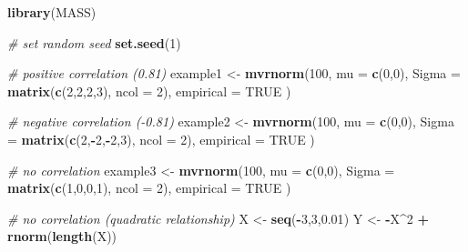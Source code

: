 \documentclass[]{book}
\newenvironment{Shaded}{\begin{snugshade}}{\end{snugshade}}
\newcommand{\KeywordTok}[1]{\textcolor[rgb]{0.13,0.29,0.53}{\textbf{#1}}}
\newcommand{\DataTypeTok}[1]{\textcolor[rgb]{0.13,0.29,0.53}{#1}}
\newcommand{\DecValTok}[1]{\textcolor[rgb]{0.00,0.00,0.81}{#1}}
\newcommand{\FloatTok}[1]{\textcolor[rgb]{0.00,0.00,0.81}{#1}}
\newcommand{\StringTok}[1]{\textcolor[rgb]{0.31,0.60,0.02}{#1}}
\newcommand{\CommentTok}[1]{\textcolor[rgb]{0.56,0.35,0.01}{\textit{#1}}}
\newcommand{\OtherTok}[1]{\textcolor[rgb]{0.56,0.35,0.01}{#1}}
\newcommand{\OperatorTok}[1]{\textcolor[rgb]{0.81,0.36,0.00}{\textbf{#1}}}
\newcommand{\NormalTok}[1]{#1}
\theoremstyle{definition}
\theoremstyle{definition}
\theoremstyle{definition}
\theoremstyle{remark}
\begin{document}
\begin{Shaded}
\begin{Highlighting}[]
\KeywordTok{library}\NormalTok{(MASS)}

\CommentTok{# set random seed}
\KeywordTok{set.seed}\NormalTok{(}\DecValTok{1}\NormalTok{)}

\CommentTok{# positive correlation (0.81)}
\NormalTok{example1 <-}\StringTok{ }\KeywordTok{mvrnorm}\NormalTok{(}\DecValTok{100}\NormalTok{,}
                    \DataTypeTok{mu =} \KeywordTok{c}\NormalTok{(}\DecValTok{0}\NormalTok{,}\DecValTok{0}\NormalTok{), }
                    \DataTypeTok{Sigma =} \KeywordTok{matrix}\NormalTok{(}\KeywordTok{c}\NormalTok{(}\DecValTok{2}\NormalTok{,}\DecValTok{2}\NormalTok{,}\DecValTok{2}\NormalTok{,}\DecValTok{3}\NormalTok{), }\DataTypeTok{ncol =} \DecValTok{2}\NormalTok{),}
                    \DataTypeTok{empirical =} \OtherTok{TRUE}
\NormalTok{                    )}

\CommentTok{# negative correlation (-0.81)}
\NormalTok{example2 <-}\StringTok{ }\KeywordTok{mvrnorm}\NormalTok{(}\DecValTok{100}\NormalTok{,}
                    \DataTypeTok{mu =} \KeywordTok{c}\NormalTok{(}\DecValTok{0}\NormalTok{,}\DecValTok{0}\NormalTok{), }
                    \DataTypeTok{Sigma =} \KeywordTok{matrix}\NormalTok{(}\KeywordTok{c}\NormalTok{(}\DecValTok{2}\NormalTok{,}\OperatorTok{-}\DecValTok{2}\NormalTok{,}\OperatorTok{-}\DecValTok{2}\NormalTok{,}\DecValTok{3}\NormalTok{), }\DataTypeTok{ncol =} \DecValTok{2}\NormalTok{),}
                    \DataTypeTok{empirical =} \OtherTok{TRUE}
\NormalTok{                    )}

\CommentTok{# no correlation }
\NormalTok{example3 <-}\StringTok{ }\KeywordTok{mvrnorm}\NormalTok{(}\DecValTok{100}\NormalTok{,}
                    \DataTypeTok{mu =} \KeywordTok{c}\NormalTok{(}\DecValTok{0}\NormalTok{,}\DecValTok{0}\NormalTok{), }
                    \DataTypeTok{Sigma =} \KeywordTok{matrix}\NormalTok{(}\KeywordTok{c}\NormalTok{(}\DecValTok{1}\NormalTok{,}\DecValTok{0}\NormalTok{,}\DecValTok{0}\NormalTok{,}\DecValTok{1}\NormalTok{), }\DataTypeTok{ncol =} \DecValTok{2}\NormalTok{),}
                    \DataTypeTok{empirical =} \OtherTok{TRUE}
\NormalTok{                    )}

\CommentTok{# no correlation (quadratic relationship)}
\NormalTok{X <-}\StringTok{ }\KeywordTok{seq}\NormalTok{(}\OperatorTok{-}\DecValTok{3}\NormalTok{,}\DecValTok{3}\NormalTok{,}\FloatTok{0.01}\NormalTok{)}
\NormalTok{Y <-}\StringTok{ }\OperatorTok{-}\NormalTok{X}\OperatorTok{^}\DecValTok{2} \OperatorTok{+}\StringTok{ }\KeywordTok{rnorm}\NormalTok{(}\KeywordTok{length}\NormalTok{(X))}


\end{Highlighting}
\end{Shaded}
\end{document}
